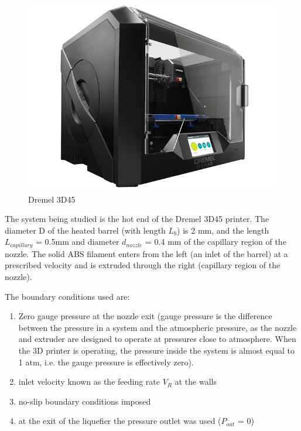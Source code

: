 \documentclass{report}
\begin{document}
{\begin{figure}
    \includegraphics[width=1\linewidth]{printer.png}
    \caption{Dremel 3D45}
    \label{fig:Dremel 3D45}
\end{figure}

The system being studied is the hot end of the Dremel 3D45 printer. The diameter D of the heated barrel (with length $L_b$) is 2 mm, and the length $L_{capillary}$ = 0.5mm and diameter $d_{nozzle}$ = 0.4 mm of the capillary region of the nozzle. The solid ABS filament enters from the left (an inlet of the barrel) at a prescribed velocity and is extruded through the right (capillary region of the nozzle).

The boundary conditions used are:

\begin{enumerate}
    \item Zero gauge pressure at the nozzle exit (gauge pressure is the difference between the pressure in a system and the atmospheric pressure, as the nozzle and extruder are designed to operate at pressures close to atmosphere. When the 3D printer is operating, the pressure inside the system is almost equal to 1 atm, i.e. the gauge pressure is effectively zero).
    \item inlet velocity known as the feeding rate ${V_R}$ at the walls
    \item no-slip boundary conditions imposed
    \item at the exit of the liquefier the pressure outlet was used ($P_{out}$ = 0)
\end{enumerate}

}
\end{document}
